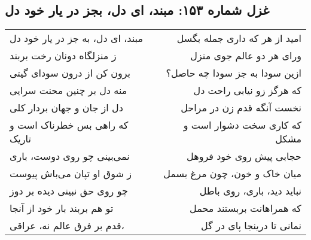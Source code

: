 \begin{center}
\section*{غزل شماره ۱۵۳: مبند، ای دل، بجز در یار خود دل}
\label{sec:153}
\begin{longtable}{l p{0.5cm} r}
مبند، ای دل، به جز در یار خود دل
&&
امید از هر که داری جمله بگسل
\\
ز منزلگاه دونان رخت بربند
&&
ورای هر دو عالم جوی منزل
\\
برون کن از درون سودای گیتی
&&
ازین سودا به جز سودا چه حاصل؟
\\
منه دل بر چنین محنت سرایی
&&
که هرگز زو نیابی راحت دل
\\
دل از جان و جهان بردار کلی
&&
نخست آنگه قدم زن در مراحل
\\
که راهی بس خطرناک است و تاریک
&&
که کاری سخت دشوار است و مشکل
\\
نمی‌بینی چو روی دوست، باری
&&
حجابی پیش روی خود فروهل
\\
ز شوق او تپان می‌باش پیوست
&&
میان خاک و خون، چون مرغ بسمل
\\
چو روی حق نبینی دیده بر دوز
&&
نباید دید، باری، روی باطل
\\
تو هم بربند بار خود از آنجا
&&
که همراهانت بربستند محمل
\\
قدم بر فرق عالم نه، عراقی،
&&
نمانی تا درینجا پای در گل
\\
\end{longtable}
\end{center}
